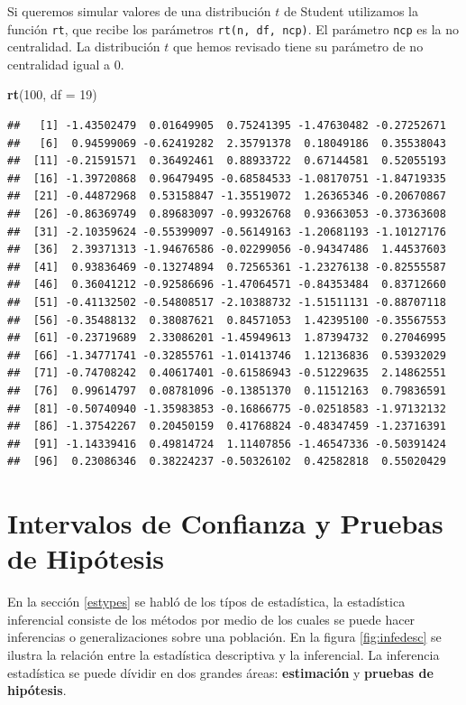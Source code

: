 \documentclass[
]{krantz}
\makeatletter
\newenvironment{Shaded}{\begin{snugshade}}{\end{snugshade}}
\newcommand{\DataTypeTok}[1]{\textcolor[rgb]{0.27,0.27,0.27}{#1}}
\newcommand{\DecValTok}[1]{\textcolor[rgb]{0.06,0.06,0.06}{#1}}
\newcommand{\KeywordTok}[1]{\textcolor[rgb]{0.27,0.27,0.27}{\textbf{#1}}}
\newcommand{\NormalTok}[1]{#1}
\newenvironment{kframe}{%
\medskip{}
\setlength{\fboxsep}{.8em}
 \def\at@end@of@kframe{}%
 \ifinner\ifhmode%
  \def\at@end@of@kframe{\end{minipage}}%
  \begin{minipage}{\columnwidth}%
 \fi\fi%
 \def\FrameCommand##1{\hskip\@totalleftmargin \hskip-\fboxsep
 \colorbox{shadecolor}{##1}\hskip-\fboxsep
     \hskip-\linewidth \hskip-\@totalleftmargin \hskip\columnwidth}%
 \MakeFramed {\advance\hsize-\width
   \@totalleftmargin\z@ \linewidth\hsize
   \@setminipage}}%
 {\par\unskip\endMakeFramed%
 \at@end@of@kframe}
\renewenvironment{Shaded}{\begin{kframe}}{\end{kframe}}
\makeatother
\begin{document}
Si queremos simular valores de una distribución \(t\) de Student utilizamos la función \texttt{rt}, que recibe los parámetros \texttt{rt(n,\ df,\ ncp)}. El parámetro \texttt{ncp} es la no centralidad. La distribución \(t\) que hemos revisado tiene su parámetro de no centralidad igual a \(0\).

\begin{Shaded}
\begin{Highlighting}[]
\KeywordTok{rt}\NormalTok{(}\DecValTok{100}\NormalTok{, }\DataTypeTok{df =} \DecValTok{19}\NormalTok{)}
\end{Highlighting}
\end{Shaded}

\begin{verbatim}
##   [1] -1.43502479  0.01649905  0.75241395 -1.47630482 -0.27252671
##   [6]  0.94599069 -0.62419282  2.35791378  0.18049186  0.35538043
##  [11] -0.21591571  0.36492461  0.88933722  0.67144581  0.52055193
##  [16] -1.39720868  0.96479495 -0.68584533 -1.08170751 -1.84719335
##  [21] -0.44872968  0.53158847 -1.35519072  1.26365346 -0.20670867
##  [26] -0.86369749  0.89683097 -0.99326768  0.93663053 -0.37363608
##  [31] -2.10359624 -0.55399097 -0.56149163 -1.20681193 -1.10127176
##  [36]  2.39371313 -1.94676586 -0.02299056 -0.94347486  1.44537603
##  [41]  0.93836469 -0.13274894  0.72565361 -1.23276138 -0.82555587
##  [46]  0.36041212 -0.92586696 -1.47064571 -0.84353484  0.83712660
##  [51] -0.41132502 -0.54808517 -2.10388732 -1.51511131 -0.88707118
##  [56] -0.35488132  0.38087621  0.84571053  1.42395100 -0.35567553
##  [61] -0.23719689  2.33086201 -1.45949613  1.87394732  0.27046995
##  [66] -1.34771741 -0.32855761 -1.01413746  1.12136836  0.53932029
##  [71] -0.74708242  0.40617401 -0.61586943 -0.51229635  2.14862551
##  [76]  0.99614797  0.08781096 -0.13851370  0.11512163  0.79836591
##  [81] -0.50740940 -1.35983853 -0.16866775 -0.02518583 -1.97132132
##  [86] -1.37542267  0.20450159  0.41768824 -0.48347459 -1.23716391
##  [91] -1.14339416  0.49814724  1.11407856 -1.46547336 -0.50391424
##  [96]  0.23086346  0.38224237 -0.50326102  0.42582818  0.55020429
\end{verbatim}

\hypertarget{icph}{%
\chapter{Intervalos de Confianza y Pruebas de Hipótesis}\label{icph}}

En la sección \ref{estypes} se habló de los típos de estadística, la estadística inferencial consiste de los métodos por medio de los cuales se puede hacer inferencias o generalizaciones sobre una población. En la figura \ref{fig:infedesc} se ilustra la relación entre la estadística descriptiva y la inferencial. La inferencia estadística se puede dívidir en dos grandes áreas: \textbf{estimación} y \textbf{pruebas de hipótesis}.
\end{document}
